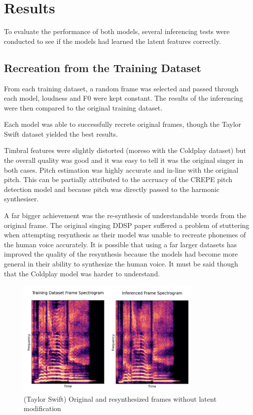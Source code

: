 \section{Results}

To evaluate the performance of both models, several inferencing tests were conducted to see if the models had learned the latent features correctly.

\subsection{Recreation from the Training Dataset}

From each training dataset, a random frame was selected and passed through each model, loudness and F0 were kept constant. The results of the inferencing were then compared to the original training dataset.

Each model was able to successfully recrete original frames, though the Taylor Swift dataset yielded the best results.

Timbral features were slightly distorted (moreso with the Coldplay dataset) but the overall quality was good and it was easy to tell it was the original singer in both cases. Pitch estimation was highly accurate and in-line with the original pitch. This can be partially attributed to the accruacy of the CREPE pitch detection model\cite{CREPE} and because pitch was directly passed to the harmonic synthesiser.

A far bigger achievement was the re-synthesis of understandable words from the original frame. The original singing DDSP paper\cite{SingingDDSP} suffered a problem of stuttering when attempting resynthesis as their model was unable to recreate phonemes of the human voice accurately. It is possible that using a far larger datasets has improved the quality of the resynthesis because the models had become more general in their ability to synthesize the human voice. It must be said though that the Coldplay model was harder to understand.

\begin{figure}[H]
    \centering
    \includegraphics[width=0.8\textwidth]{research/results/TaylorSwift/InferredRecreation.png}
    \caption{(Taylor Swift) Original and resynthesized frames without latent modification}
\end{figure}

